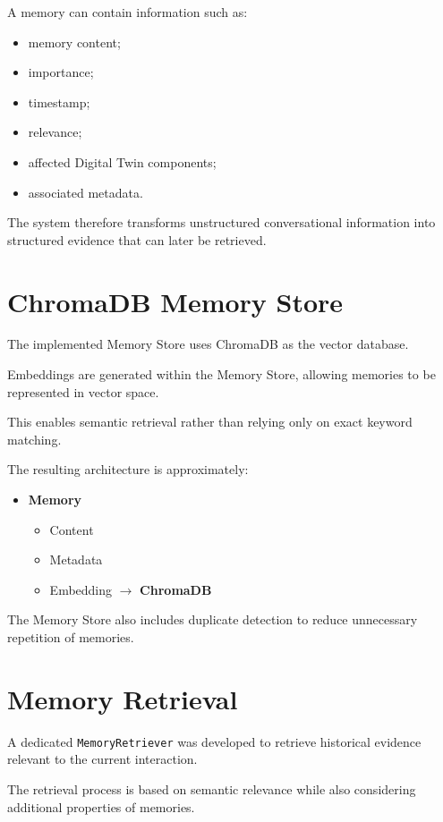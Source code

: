 \documentclass[12pt,a4paper]{article}
\begin{document}
A memory can contain information such as:
\begin{itemize}[noitemsep,topsep=2pt]
    \item memory content;
    \item importance;
    \item timestamp;
    \item relevance;
    \item affected Digital Twin components;
    \item associated metadata.
\end{itemize}

The system therefore transforms unstructured conversational information into structured evidence that can later be retrieved.

\section{ChromaDB Memory Store}
The implemented Memory Store uses ChromaDB as the vector database.

Embeddings are generated within the Memory Store, allowing memories to be represented in vector space.

This enables semantic retrieval rather than relying only on exact keyword matching.

The resulting architecture is approximately:
\begin{itemize}[noitemsep,topsep=2pt]
    \item[] \textbf{Memory}
    \begin{itemize}[noitemsep,topsep=1pt]
        \item[$\vdash$] Content
        \item[$\vdash$] Metadata
        \item[$\llcorner$] Embedding $\longrightarrow$ \textbf{ChromaDB}
    \end{itemize}
\end{itemize}

The Memory Store also includes duplicate detection to reduce unnecessary repetition of memories.

\section{Memory Retrieval}
A dedicated \texttt{MemoryRetriever} was developed to retrieve historical evidence relevant to the current interaction.

The retrieval process is based on semantic relevance while also considering additional properties of memories.
\end{document}

